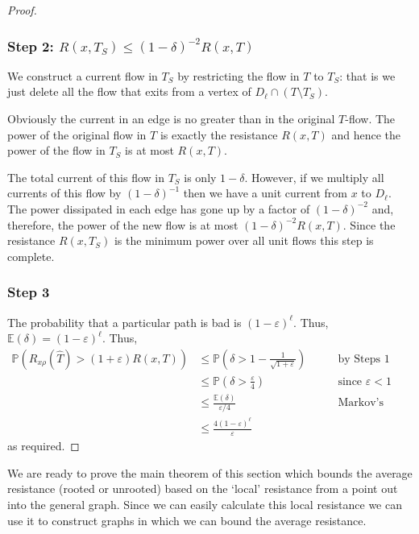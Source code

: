 \documentclass[11pt]{article}
\theoremstyle{remark}
\def\eps{\varepsilon}
\def\E{\mathbb{E}}
\newcommand\Prb{\mathbb{P}}
\begin{document}
\begin{proof}
\subsubsection*{Step 2: $R(x,T_S)\le (1-\delta)^{-2}R(x,T)$}
We construct a current flow in $T_S$ by restricting the flow in $T$ to
$T_S$: that is we just delete all the flow that exits from a vertex of
$D_\ell\cap (T\setminus T_S)$.

Obviously the current in an edge is no greater than in the original
$T$-flow. The power of the original flow in $T$ is exactly the resistance
$R(x,T)$ and hence the power of the flow in $T_S$ is at most
$R(x,T)$.

The total current of this flow in $T_S$ is only $1-\delta$. However,
if we multiply all currents of this flow by $(1-\delta)^{-1}$ then we
have a unit current from $x$ to $D_\ell$. The power dissipated in each
edge has gone up by a factor of $(1-\delta)^{-2}$ and, therefore, the
power of the new flow is at most $(1-\delta)^{-2}R(x,T)$.  Since the
resistance $R(x,T_S)$ is the minimum power over all unit flows this step
is complete.

\subsubsection*{Step 3}

The probability that a particular path is bad is $(1-\eps)^\ell$. Thus,
$\E(\delta)=(1-\eps)^\ell$.  Thus,
\begin{align*}
\Prb\left(R_{x\rho}(\widehat T)>(1+\eps)R(x,T)\right)
&\le\Prb\left(\delta>1-\frac{1}{\sqrt{1+\eps}}\right)\qquad&\text{by Steps 1 and 2}\\
&\le\Prb\left(\delta>\frac{\eps}{4}\right)&\text{since $\eps<1$}\\
&\le \frac{\E(\delta)}{\eps/4}&\text{Markov's Inequality}\\
&\le \frac{4(1-\eps)^\ell}{\eps}
\end{align*}
as required.
\end{proof}
We are ready to prove the main theorem of this section which bounds the average resistance (rooted or unrooted)
based on the `local' resistance from a point out into the general
graph. Since we can easily calculate this local resistance we can use
it to construct graphs in which we can bound the average resistance.
\end{document}
